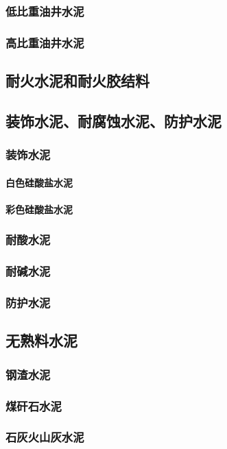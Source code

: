 \documentclass[UTF8]{../../ApplicationUniverse}
\begin{document}
        \subsubsection{低比重油井水泥}
        \subsubsection{高比重油井水泥}
    \subsection{耐火水泥和耐火胶结料}
    \subsection{装饰水泥、耐腐蚀水泥、防护水泥}
        \subsubsection{装饰水泥}
            \paragraph{白色硅酸盐水泥}
            \paragraph{彩色硅酸盐水泥}
        \subsubsection{耐酸水泥}
        \subsubsection{耐碱水泥}
        \subsubsection{防护水泥}
    \subsection{无熟料水泥}
        \subsubsection{钢渣水泥}
        \subsubsection{煤矸石水泥}
        \subsubsection{石灰火山灰水泥}
\end{document}
